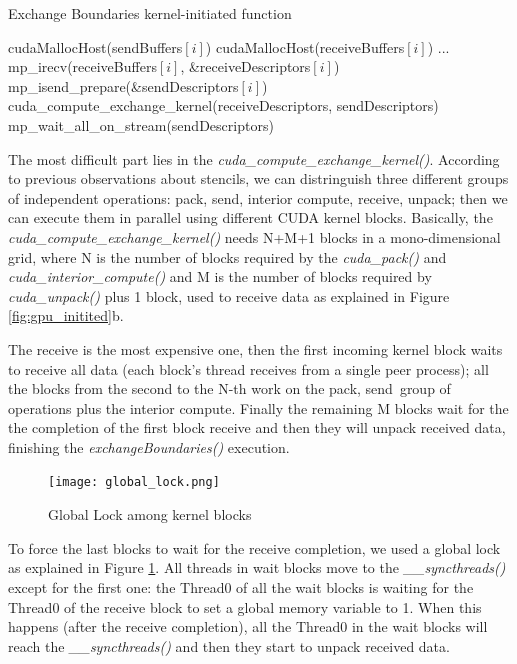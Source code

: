 \documentclass[conference]{IEEEtran}
\begin{document}
\begin{algorithm}
\small
\caption{Exchange Boundaries kernel-initiated function}
\label{algo:exchange_boundaries_gpu}
\begin{algorithmic}[1]
\State cudaMallocHost(sendBuffers$[i]$)
\State cudaMallocHost(receiveBuffers$[i]$)
\EndFor
\State ...
		\State mp\_irecv(receiveBuffers$[i]$, \&receiveDescriptors$[i]$)    
	\EndFor
		\State mp\_isend\_prepare(\&sendDescriptors$[i]$)
	\EndFor
	\State cuda\_compute\_exchange\_kernel(receiveDescriptors, sendDescriptors)
	\State mp\_wait\_all\_on\_stream(sendDescriptors)
\EndFunction
\end{algorithmic}
\end{algorithm}

The most difficult part lies in the \textit{cuda\_compute\_exchange\_kernel()}. According to previous observations about stencils, we can distringuish three different groups of independent operations: \lbrack pack, send\rbrack, \lbrack interior compute\rbrack, \lbrack receive, unpack\rbrack; then we can execute them in parallel using different CUDA kernel blocks.
Basically, the \textit{cuda\_compute\_exchange\_kernel()} needs N+M+1 blocks in a mono-dimensional grid, where N is the number of blocks required by the \textit{cuda\_pack()} and \textit{cuda\_interior\_compute()} and M is the number of blocks required by \textit{cuda\_unpack()} plus 1 block, used to receive data as explained in Figure \ref{fig:gpu_initited}b.

The receive is the most expensive one, then the first incoming kernel block waits to receive all data (each block's thread receives from a single peer process); all the blocks from the second to the N-th work on the \lbrack pack, send\rbrack \ group of operations plus the \lbrack interior compute\rbrack. Finally the remaining M blocks wait for the the completion of the first block receive and then they will unpack received data, finishing the \textit{exchangeBoundaries()} execution.

\begin{figure}[h]
\texttt{[image: global\_lock.png]}
\caption{Global Lock among kernel blocks}
\label{fig:global_lock}
\end{figure}

To force the last blocks to wait for the receive completion, we used a global lock as explained in Figure \ref{fig:global_lock}. All threads in wait blocks move to the \textit{\_\_syncthreads()} except for the first one: the Thread0 of all the wait blocks is waiting for the Thread0 of the receive block to set a global memory variable to 1. When this happens (after the receive completion), all the Thread0 in the wait blocks will reach the \textit{\_\_syncthreads()} and then they start to unpack received data.
\end{document}
